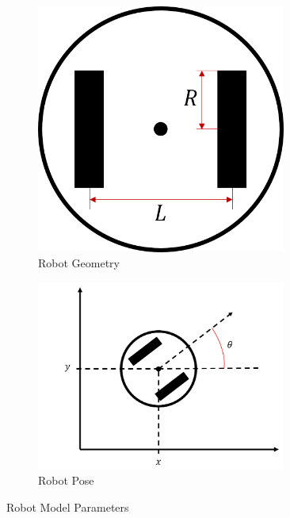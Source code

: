\begin{figure}
    \centering
    \begin{subfigure}{0.3\textwidth}
        \centering
        \includegraphics[width=0.9\textwidth]{figs/img/robotGeometry.png}
        \caption{Robot Geometry}
        \label{fig:robotGeometry}
    \end{subfigure}%
    \begin{subfigure}{0.7\textwidth}
        \centering
        \includegraphics[width=0.9\textwidth]{figs/img/robotPose.png}
        \caption{Robot Pose}
        \label{fig:robotPose}
    \end{subfigure}
    \caption{Robot Model Parameters}
    \label{fig:robotModelParameters}
\end{figure}

